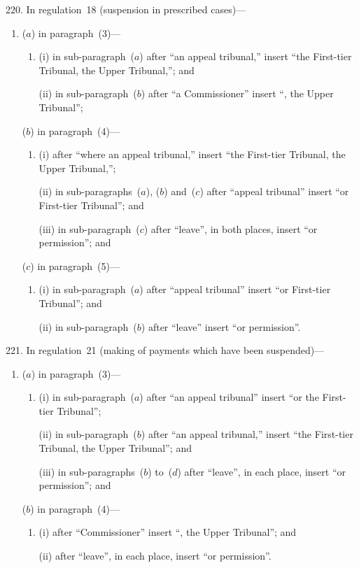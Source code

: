 \documentclass[12pt,a4paper]{article}
\begin{document}
\medskip

220.  In regulation~18 (suspension in prescribed cases)—
\begin{enumerate}\item[]
($a$) in paragraph~(3)—
\begin{enumerate}\item[]
(i) in sub-paragraph~($a$)  after “an appeal tribunal,” insert “the First-tier Tribunal, the Upper Tribunal,”; and

(ii) in sub-paragraph~($b$)  after “a Commissioner” insert “, the Upper Tribunal”;
\end{enumerate}

($b$) in paragraph~(4)—
\begin{enumerate}\item[]
(i) after “where an appeal tribunal,” insert “the First-tier Tribunal, the Upper Tribunal,”;

(ii) in sub-paragraphs~($a$), ($b$)  and~($c$)  after “appeal tribunal” insert “or First-tier Tribunal”; and

(iii) in sub-paragraph~($c$)  after “leave”, in both places, insert “or permission”; and
\end{enumerate}

($c$) in paragraph~(5)—
\begin{enumerate}\item[]
(i) in sub-paragraph~($a$)  after “appeal tribunal” insert “or First-tier Tribunal”; and

(ii) in sub-paragraph~($b$)  after “leave” insert “or permission”.
\end{enumerate}
\end{enumerate}

\medskip

221.  In regulation~21 (making of payments which have been suspended)—
\begin{enumerate}\item[]
($a$) in paragraph~(3)—
\begin{enumerate}\item[]
(i) in sub-paragraph~($a$)  after “an appeal tribunal” insert “or the First-tier Tribunal”;

(ii) in sub-paragraph~($b$)  after “an appeal tribunal,” insert “the First-tier Tribunal, the Upper Tribunal”; and

(iii) in sub-paragraphs~($b$)  to~($d$)  after “leave”, in each place, insert “or permission”; and
\end{enumerate}

($b$) in paragraph~(4)—
\begin{enumerate}\item[]
(i) after “Commissioner” insert “, the Upper Tribunal”; and

(ii) after “leave”, in each place, insert “or permission”.
\end{enumerate}
\end{enumerate}
\end{document}
